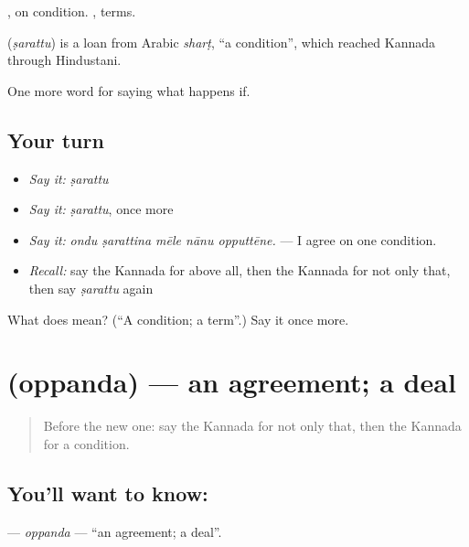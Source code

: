  , on condition. , terms.

\begin{cousinweb}
\textbf{} (\emph{ṣarattu}) is a loan from Arabic \emph{sharṭ}, \textquotedblleft{}a condition\textquotedblright{}, which reached Kannada through Hindustani.
\end{cousinweb}

\begin{grammarlens}[title={What you've built}]
One more word for saying what happens if.
\end{grammarlens}

\subsection*{Your turn}
\begin{itemize}
\raggedright
  \item \emph{Say it:} \emph{ṣarattu}
  \item \emph{Say it:} \emph{ṣarattu}, once more
  \item \emph{Say it:} \emph{ondu ṣarattina mēle nānu opputtēne.} — I agree on one condition.
  \item \emph{Recall:} say the Kannada for above all, then the Kannada for not only that, then say \emph{ṣarattu} again
\end{itemize}

\begin{tcolorbox}[breakable,colback=teal!4,colframe=teal!35!black,title={Before you move on}]
What does  mean? (\textquotedblleft{}A condition; a term\textquotedblright{}.) Say it once more.
\end{tcolorbox}
\section[\texorpdfstring{\kn{ಒಪ್ಪಂದ} (oppanda)}{ಒಪ್ಪಂದ (oppanda)}]{ (oppanda) — an agreement; a deal}

\label{lesson:KA-C411-oppanda}



\begin{quote}
Before the new one: say the Kannada for not only that, then the Kannada for a condition.
\end{quote}

\subsection*{You'll want to know: }
\textbf{} — \emph{oppanda} — \textquotedblleft{}an agreement; a deal\textquotedblright{}.

